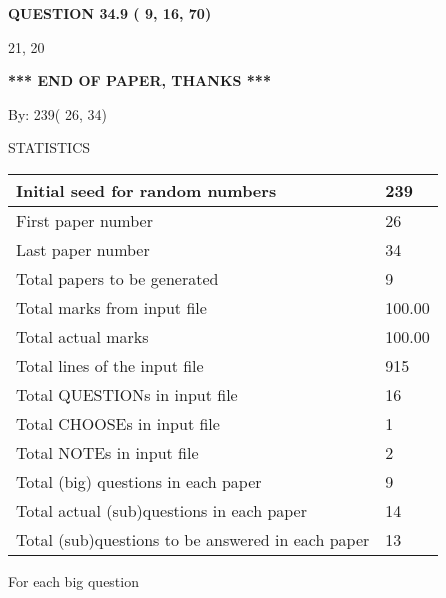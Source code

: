 \documentclass[12pt]{article}
\begin{document}
  
{\textbf{\large{QUESTION
34.9 
 (          9,         16,         70)
}}}

21,  %
20
 
   
   
   
   
\vspace{1.0in} 
{\textbf{\large{ *** END OF PAPER, THANKS *** }}} 
   
   
\hspace{1.0in} By: 
         239(         26,          34)
   
   
   
\vspace{0.2in}
\vspace{0.2in}
   
   
 \newpage
\setcounter{page}{1} 
   
   
 {\LARGE{STATISTICS}}
   
\vspace{0.2in}
   
 \begin{tabular}{|l|l|}
 \hline
 Initial seed for random numbers &        239 \\
\hline
 First paper number &         26 \\
\hline
 Last  paper number &         34 \\
\hline
 Total papers to be generated &          9 \\
\hline
Total marks from input file & 100.00 \\
\hline
Total actual marks & 100.00 \\
\hline
 Total lines of the input file &        915 \\
 \hline
 Total QUESTIONs in input file &         16 \\
\hline
 Total CHOOSEs in input file &          1 \\
\hline
 Total NOTEs in input file &          2 \\
\hline
 Total (big) questions in each paper &          9 \\
\hline
 Total actual (sub)questions in each paper &         14 \\
\hline
 Total (sub)questions to be answered in each paper &         13 \\
\hline
 \end{tabular}
   
   
 \newpage
   
{\LARGE{For each big question}}
   
   
\vspace{0.2in}
   
\end{document}
